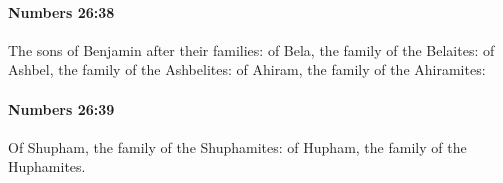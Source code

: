 		\paragraph{Numbers 26:38} %
			\label{NUMBERS-26-38}

			The sons of Benjamin after their families: of Bela, the family of the Belaites: of Ashbel, the family of the Ashbelites: of Ahiram, the family of the Ahiramites:


		\paragraph{Numbers 26:39} %
			\label{NUMBERS-26-39}

			Of Shupham, the family of the Shuphamites: of Hupham, the family of the Huphamites.


